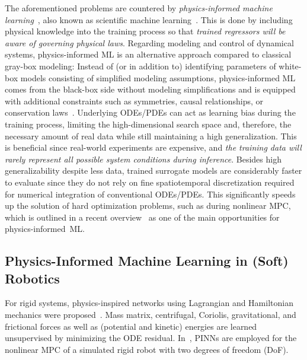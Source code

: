 The aforementioned problems are countered by \textit{physics-informed machine learning}~\cite{Karniadakis.2021}, also known as scientific machine learning~\cite{Cuomo.14.01.2022}. 
This is done by including physical knowledge into the training process so that \textit{trained regressors will be aware of governing physical laws}. %
Regarding modeling and control of dynamical systems, physics-informed ML is an alternative approach compared to classical gray-box modeling: 
Instead of (or in addition to) identifying parameters of white-box models consisting of simplified modeling assumptions, physics-informed ML comes from the black-box side without modeling simplifications and is equipped with additional constraints such as symmetries, causal relationships, or conservation laws~\cite{Nghiem.2023}.
Underlying ODEs/PDEs can act as learning bias during the training process, limiting the high-dimensional search space and, therefore, the necessary amount of real data while still maintaining a high generalization. 
This is beneficial since real-world experiments are expensive, and \textit{the training data will rarely represent all possible system conditions during inference}.
Besides high generalizability despite less data, trained surrogate models are considerably faster to evaluate since they do not rely on fine spatiotemporal discretization required for numerical integration of conventional ODEs/PDEs. 
This significantly speeds up the solution of hard optimization problems, such as during nonlinear MPC, which is outlined in a recent overview~\cite{Nghiem.2023} as one of the main opportunities for physics-informed~ML.

\subsection{Physics-Informed Machine Learning in (Soft) Robotics}
For rigid systems, physics-inspired networks using Lagrangian and Hamiltonian mechanics were proposed~\cite{Lutter.2019,Lutter.05.10.2021}. 
Mass matrix, centrifugal, Coriolis, gravitational, and frictional forces as well as (potential and kinetic) energies are learned unsupervised by minimizing the ODE residual. 
In~\cite{Nicodemus.2022}, PINNs are employed for the nonlinear MPC of a simulated rigid robot with two degrees of freedom (DoF).


